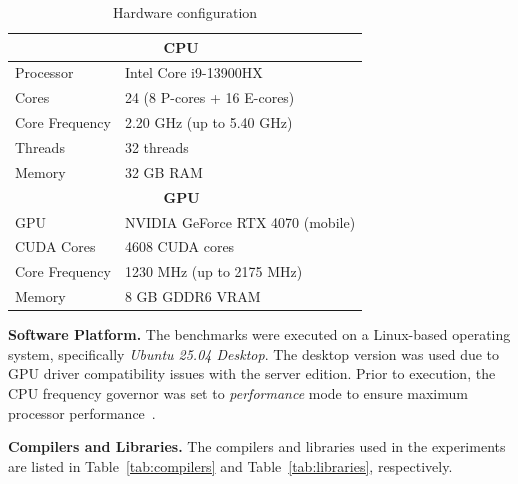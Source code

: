 \documentclass[sigconf]{acmart}
\newcommand{\mypar}[1]{{\bf #1.}}
\begin{document}
\begin{table}[h]
      \centering
      \caption{Hardware configuration}\label{tab:hardware-config}
      \begin{tabular}{|l|l|}
            \hline
            \multicolumn{2}{|c|}{\textbf{CPU}~\cite{cpu_specs}} \\
            \hline
            Processor      & Intel Core i9-13900HX              \\
            Cores          & 24 (8 P-cores + 16 E-cores)        \\
            Core Frequency & 2.20 GHz (up to 5.40 GHz)          \\
            Threads        & 32 threads                         \\
            Memory         & 32 GB RAM                          \\
            \hline
            \hline
            \multicolumn{2}{|c|}{\textbf{GPU}~\cite{gpu_specs}} \\
            \hline
            GPU            & NVIDIA GeForce RTX 4070 (mobile)   \\
            CUDA Cores     & 4608 CUDA cores                    \\
            Core Frequency & 1230 MHz (up to 2175 MHz)          \\
            Memory         & 8 GB GDDR6 VRAM                    \\
            \hline
      \end{tabular}
\end{table}

\mypar{Software Platform}
The benchmarks were executed on a Linux-based operating system, specifically \textit{Ubuntu 25.04 Desktop}.
The desktop version was used due to GPU driver compatibility issues with the server edition. Prior to execution,
the CPU frequency governor was set to \textit{performance} mode to ensure maximum processor performance~\cite{google_benchmark:governor}.

\mypar{Compilers and Libraries}
The compilers and libraries used in the experiments are listed in Table~\ref{tab:compilers} and Table~\ref{tab:libraries}, respectively.
\end{document}
